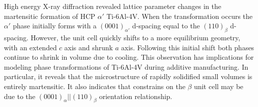 High energy X-ray diffraction revealed lattice parameter changes in the martensitic formation of HCP $\alpha'$ Ti-6Al-4V. When the transformation occurs the $\alpha'$ phase initially forms with a $(0001)_{\alpha'}$ d-spacing equal to the $(110)_{\beta}$ d-spacing. However, the unit cell quickly shifts to a more equilibrium geometry, with an extended $c$ axis and shrunk $a$ axis. Following this initial shift both phases continue to shrink in volume due to cooling. This observation has implications for modeling phase transformations of Ti-6Al-4V during additive manufacturing. In particular, it reveals that the microstructure of rapidly solidified small volumes is entirely martensitic. It also indicates that constrains on the $\beta$ unit cell may be due to the $(0001)_{\alpha}||(110)_\beta$ orientation relationship. 

